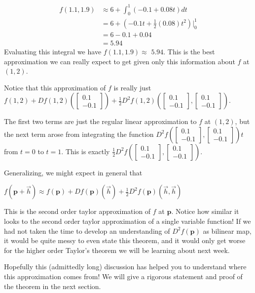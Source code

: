 \documentclass{article}
\newcommand{\verticalvector}[1]{\begin{bmatrix}#1\end{bmatrix}}
\newcommand{\answer}[1]{#1}
\newenvironment{question}{}{}
\newenvironment{hint}{}{}
\newenvironment{solution}{}{}
\newenvironment{theorem}{}{}
\begin{document}
\begin{question}
  \begin{solution}
    \begin{hint}
      \begin{align*}
        f(1.1,1.9) &\approx 6+ \displaystyle\int_0^1 (-0.1+0.08t) dt\\
        &=6+\left(-0.1t+\frac{1}{2}(0.08)t^2 \right)\big|_{0}^{1}\\
        &=6-0.1+0.04\\
        &=5.94
      \end{align*}
    \end{hint}
    Evaluating this integral we have $f(1.1,1.9) \approx $ \answer{ $5.94$}.  This is the best approximation we can really expect to get given only this
    information about $f$ at $(1,2)$.
  \end{solution}
  
  Notice that this approximation of $f$ is really just 
  $f(1,2)+Df(1,2) \left(\verticalvector{0.1\\-0.1} \right)+ \frac{1}{2} D^2f(1,2)\left( \verticalvector{0.1\\-0.1}, \verticalvector{0.1\\-0.1}\right)$.
  
  The first two terms are just the regular linear approximation to $f$ at $(1,2)$, but the next term arose from integrating the function 
  $D^2f( \verticalvector{0.1\\-0.1},\verticalvector{0.1\\-0.1})t$ from $t=0$ to $t=1$.  This is  exactly
  $\frac{1}{2} D^2f(\verticalvector{0.1\\-0.1},\verticalvector{0.1\\-0.1})$.
  
  Generalizing, we might expect in general that 
  
  \begin{theorem}
    \(f(\mathbf{p} + \vec{h}) \approx f(\mathbf{p}) + Df(\mathbf{p})(\vec{h})+ \frac{1}{2} D^2f(\mathbf{p})\left( \vec{h},\vec{h}\right) \)
  \end{theorem}
  
  This is the second order taylor approximation of $f$ at $\mathbf{p}$.   Notice how similar it looks to the second order taylor approximation 
  of a single variable function!  If we had not taken the time to develop an understanding of $D^2f(\mathbf{p})$ as bilinear map, it would be quite messy 
  to even state this theorem, and it would only get worse for the higher order Taylor's theorem we will be learning about next week.
  
  Hopefully this (admittedly long) discussion has helped you to understand where this approximation comes from!  We will give a rigorous statement
  and proof of the theorem in the next section.
  
\end{question}
\end{document}
